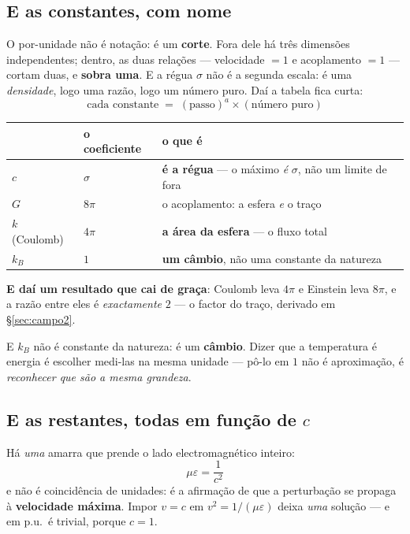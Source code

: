 \documentclass[11pt,a4paper]{article}
\begin{document}
\subsection*{E as constantes, com nome}

O por-unidade não é notação: é um \textbf{corte}. Fora dele há três dimensões independentes; dentro,
as duas relações --- velocidade $=1$ e acoplamento $=1$ --- cortam duas, e \textbf{sobra uma}. E a
régua $\sigma$ não é a segunda escala: é uma \emph{densidade}, logo uma razão, logo um número puro.
Daí a tabela fica curta:
\[
  \boxed{\;\text{cada constante} \;=\; (\text{passo})^{a} \times (\text{número puro})\;}
\]

\begin{center}\small
\setlength\tabcolsep{5pt}
\begin{tabular}{@{}lll@{}}
\toprule
 & o coeficiente & o que é \\
\midrule
$c$ & $\sigma$ & \textbf{é a régua} --- o máximo \emph{é} $\sigma$, não um limite de fora \\
$G$ & $8\pi$ & o acoplamento: a esfera \emph{e} o traço \\
$k$ (Coulomb) & $4\pi$ & \textbf{a área da esfera} --- o fluxo total \\
$k_B$ & $1$ & \textbf{um câmbio}, não uma constante da natureza \\
\bottomrule
\end{tabular}
\end{center}

\noindent \textbf{E daí um resultado que cai de graça}: Coulomb leva $4\pi$ e Einstein leva $8\pi$, e
a razão entre eles é \emph{exactamente} $2$ --- o factor do traço, derivado em §\ref{sec:campo2}.

\smallskip
\noindent E $k_B$ não é constante da natureza: é um \textbf{câmbio}. Dizer que a temperatura é
energia é escolher medi-las na mesma unidade --- pô-lo em $1$ não é aproximação, é \emph{reconhecer
que são a mesma grandeza}.

\subsection*{E as restantes, todas em função de $c$}

Há \emph{uma} amarra que prende o lado electromagnético inteiro:
\[
  \boxed{\;\mu\varepsilon=\frac1{c^2}\;}
\]
e não é coincidência de unidades: é a afirmação de que a perturbação se propaga à \textbf{velocidade
máxima}. Impor $v=c$ em $v^2=1/(\mu\varepsilon)$ deixa \emph{uma} solução --- e em p.u.\ é trivial,
porque $c=1$.
\end{document}
